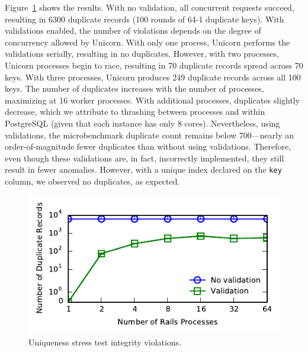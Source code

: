 Figure~\ref{fig:pk-stress} shows the results. With no validation, all
concurrent requests succeed, resulting in 6300 duplicate records (100
rounds of 64-1 duplicate keys). With validations enabled, the number
of violations depends on the degree of concurrency allowed by
Unicorn. With only one process, Unicorn performs the validations
serially, resulting in no duplicates. However, with two processes,
Unicorn processes begin to race, resulting in 70 duplicate records
spread across 70 keys. With three processes, Unicorn produces 249
duplicate records across all 100 keys. The number of duplicates
increases with the number of processes, maximizing at 16 worker
processes. With additional processes, duplicates slightly decrease,
which we attribute to thrashing between processes and within
PostgreSQL (given that each instance has only 8 cores). Nevertheless,
using validations, the microbenchmark duplicate count remains below
700---nearly an order-of-magnitude fewer duplicates than without using
validations. Therefore, even though these validations are, in fact,
incorrectly implemented, they still result in fewer
anomalies. However, with a unique index declared on the \texttt{key}
column, we observed no duplicates, as expected.

\begin{figure}
\includegraphics[width=\columnwidth]{figs/pk_stress_violations.pdf}\vspace{-1.5em}
\caption{Uniqueness stress test integrity violations.}
\label{fig:pk-stress}
\end{figure} 

